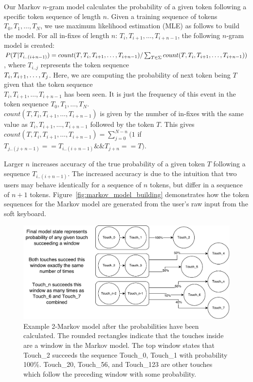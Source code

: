 \documentclass{acm_proc_article-sp}
\begin{document}
Our Markov $n$-gram model calculates the probability of a given token following a specific 
token sequence of length $n$.
Given a training sequence of tokens $T_0, T_1, \dots , T_N$,
we use maximum likelihood estimation (MLE) as follows to build the model.
For all in-fixes of
length $n$: $T_i, T_{i+1}, \dots , T_{i+n-1}$,
the following $n$-gram model is created:
$P(T | T_{i..(i+n-1)}) =  count(T, T_i, T_{i+1}, \dots , T_{i+n-1})/\sum_{T \in \Sigma} count(
T, T_i, T_{i+1}, \dots , \\T_{i+n-1}))$, where $T_{i..j}$ represents the
token sequence \\
$T_i, T_{i+\\1}, \dots, T_j$.
Here, we are computing the probability of next token being $T$
given that the token sequence \\
$T_i, T_{i+1}, \dots , T_{i+n-1}$ has been seen.
It is just the
frequency of this event in the token sequence $T_0, T_1, \dots , T_N$. \\
$count(T, T_i, T_{i+1}, \dots , T_{i+n-1})$ is given by the number of in-fixes with the same value as
$T_i, T_{i+1}, \dots , T_{i+n-1}$ followed by the token $T$. This gives 
$count(T, T_i, T_{i+1}, \dots , T_{i+n-1}) = \sum_{j=0}^{N-n}(1$ if $T_{j..(j+n-1)} == T_{i..(i+n-1)} \&\&
T_{j+n} == T)$.

Larger $n$ increases accuracy of the true probability of a given token $T$ following
a sequence $T_{i..(i+n-1)}$.
The increased accuracy is due to the intuition that 
two users may behave identically for a sequence of $n$ tokens, but
differ in a sequence of $n+1$ tokens.
Figure~\ref{fig:markov_model_building} demonstrates how the token sequences for the Markov model are generated from the user's raw input from the soft keyboard.

\begin{figure}
\centering
\includegraphics[width=.45\textwidth]{final_marcov_model_state.pdf}
\caption{Example 2-Markov model after the probabilities have been calculated.
The rounded rectangles indicate that the touches inside are a window in the Markov model.
The top window states that Touch\_2 succeeds the sequence Touch\_0, Touch\_1 with probability 100\%.
Touch\_20, Touch\_56, and Touch\_123 are other touches which follow the preceding window with some probability.}
\label{fig:final_markov_model_state}
\end{figure}
\end{document}
